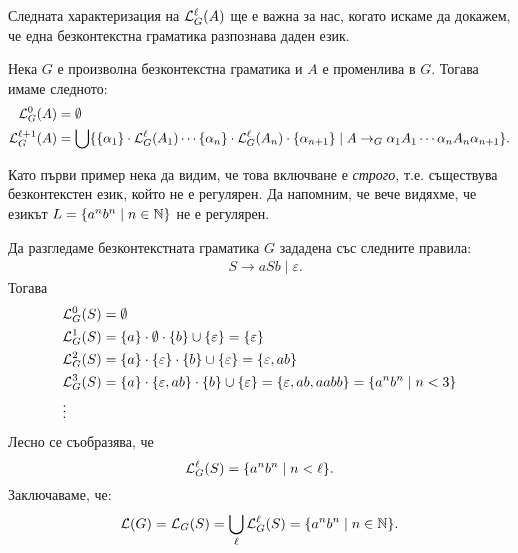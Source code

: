 Следната характеризация на $\mathcal{L}^\ell_G(A)$ ще е важна за нас, когато искаме да докажем,
че една безконтекстна граматика разпознава даден език.

\begin{proposition}\label{pr:grammar:yield-approximation}
  Нека $G$ е произволна безконтекстна граматика и $A$ е променлива в $G$.
  Тогава имаме следното:
  \begin{align*}
    \mathcal{L}^0_G(A) & = \emptyset\\
    \mathcal{L}^{\ell+1}_G(A) & = \bigcup\{\{\alpha_1\}\cdot \mathcal{L}^\ell_G(A_1) \cdots \{\alpha_n\} \cdot \mathcal{L}^\ell_G(A_n) \cdot \{\alpha_{n+1}\} \mid A \to_G \alpha_1A_1\cdots\alpha_nA_n\alpha_{n+1}\}.
  \end{align*}
\end{proposition}



Като първи пример нека да видим, че това включване е {\em строго}, т.е. съществува безконтекстен език, който не е регулярен.
Да напомним, че вече видяхме, че езикът $L = \{a^nb^n \mid n\in\mathbb{N}\}$ не е регулярен.


\begin{extra}
\begin{example}\label{ex:grammar:anbn}
  Да разгледаме безконтекстната граматика $G$ зададена със следните правила:
  \begin{align*}
    & S \to aSb \mid \varepsilon.
  \end{align*}
  Тогава
  \begin{align*}
    & \mathcal{L}^0_G(S) = \emptyset\\
    & \mathcal{L}^1_G(S) = \{a\} \cdot \emptyset \cdot \{b\} \cup \{\varepsilon\} = \{\varepsilon\}\\
    & \mathcal{L}^{2}_G(S) = \{a\} \cdot \{\varepsilon\} \cdot \{b\} \cup \{\varepsilon\} = \{\varepsilon, ab\}\\
    & \mathcal{L}^{3}_G(S) = \{a\} \cdot \{\varepsilon, ab\} \cdot \{b\} \cup \{\varepsilon\} = \{\varepsilon,ab,aabb\} = \{a^nb^n \mid n < 3\}\\
    & \vdots
  \end{align*}
  Лесно се съобразява, че
  \[\mathcal{L}^\ell_G(S) = \{a^nb^n \mid n < \ell\}.\]
  Заключаваме, че:
  \[\mathcal{L}(G) = \mathcal{L}_G(S) = \bigcup_{\ell}\mathcal{L}^\ell_G(S) = \{a^nb^n \mid n\in\mathbb{N}\}.\]
\end{example}
\end{extra}


